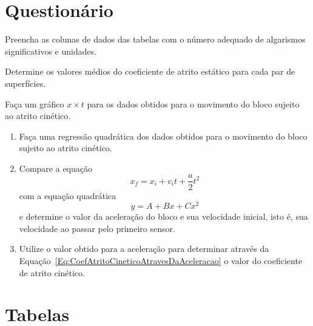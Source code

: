 \vspace{5mm}

\section{Questionário}

\begin{question}[type={exam}]{2}
Preencha as colunas de dados das tabelas com o número adequado de algarismos significativos e unidades.
\end{question}

\begin{question}[type={exam}]{2}
Determine os valores médios do coeficiente de atrito estático para cada par de superfícies.
\end{question}

\begin{question}[type={exam}]{2}
Faça um gráfico $x \times t$ para os dados obtidos para o movimento do bloco sujeito ao atrito cinético.
\end{question}

\begin{question}[type={exam}]{4}
\begin{enumerate}[label=\roman*.]
\item Faça uma regressão quadrática dos dados obtidos para o movimento do bloco sujeito ao atrito cinético.
\item Compare a equação
\begin{equation}
    x_f = x_i + v_i t + \frac{a}{2} t^2
\end{equation}
%
com a equação quadrática
\begin{equation}
    y = A + B x + C x^2
\end{equation}
%
e determine o valor da aceleração do bloco e sua velocidade inicial, isto é, sua velocidade ao passar pelo primeiro sensor.

\item Utilize o valor obtido para a aceleração para determinar através da Equação~\ref{Eq:CoefAtritoCineticoAtravesDaAceleracao} o valor do coeficiente de atrito cinético.
\end{enumerate}
\end{question}

\vfill
\pagebreak
\section{Tabelas}

